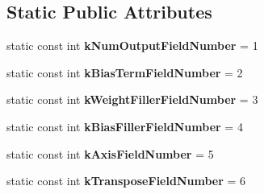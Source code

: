 \subsection*{Static Public Attributes}
\begin{DoxyCompactItemize}
\item 
\mbox{\label{classcaffe_1_1_inner_product_parameter_ad22438741ba4226726b9e7c59f391472}} 
static const int {\bfseries k\+Num\+Output\+Field\+Number} = 1
\item 
\mbox{\label{classcaffe_1_1_inner_product_parameter_a562a1602c3019d3f9cdb1ceb34d2ff2d}} 
static const int {\bfseries k\+Bias\+Term\+Field\+Number} = 2
\item 
\mbox{\label{classcaffe_1_1_inner_product_parameter_a810e406493bb08e029d9c624dc5cd1a9}} 
static const int {\bfseries k\+Weight\+Filler\+Field\+Number} = 3
\item 
\mbox{\label{classcaffe_1_1_inner_product_parameter_ae8855bb7e2d61adf6276864c3a77e4cb}} 
static const int {\bfseries k\+Bias\+Filler\+Field\+Number} = 4
\item 
\mbox{\label{classcaffe_1_1_inner_product_parameter_a41b77b98f7abb964c882099abe178656}} 
static const int {\bfseries k\+Axis\+Field\+Number} = 5
\item 
\mbox{\label{classcaffe_1_1_inner_product_parameter_addf7445a9d177ff5a2036167ee9d5281}} 
static const int {\bfseries k\+Transpose\+Field\+Number} = 6
\end{DoxyCompactItemize}
